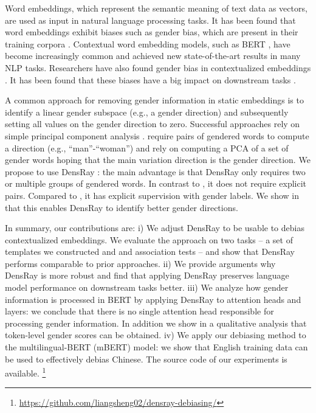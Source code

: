 Word embeddings, which represent the semantic meaning of
text data as vectors, are used as input in natural language
processing tasks. It has been found that word embeddings
exhibit biases such as gender bias, which are present in their training
corpora \cite{bolukbasi2016man,caliskan2017semantics,garg2018word}. Contextual word
embedding models, such as BERT \cite{devlin2018bert}, have
become increasingly common and achieved new state-of-the-art
results in many NLP tasks. Researchers have also found
gender bias in contextualized
embeddings \cite{zhao2019gender,may2019measuring}. It has been found that these biases have a big impact on downstream tasks \cite{vanmassenhove-etal-2018-getting,moryossef-etal-2019-filling,rudinger2018gender,zhao2018gender}.

A common approach for removing gender information in static
embeddings is to identify a linear gender subspace (e.g., a
gender direction) and subsequently setting all values on the
gender direction to zero. Successful approaches rely on simple
principal component
analysis \cite{bolukbasi2016man,mu2018all}. 
require pairs of gendered words to compute a direction
(e.g., ``man''-``woman'') and  rely on
computing a PCA of a set of gender words hoping that the
main variation direction is the gender direction. We propose to use
DensRay \cite{dufter2019analytical}: the main advantage is
that DensRay only requires two or multiple groups of
gendered words. In contrast to , it
does not require explicit pairs. Compared
to , it has explicit supervision with gender
labels. We show in  that this enables
DensRay to identify better gender directions.

In summary, our contributions are: 
i) We adjust DensRay to be usable to debias contextualized embeddings.
We evaluate the approach on two tasks -- a set of templates
we constructed and and association tests -- and show that DensRay performs comparable to prior approaches. 
ii) We provide arguments why DensRay is more robust and find that applying DensRay preserves language model performance on downstream tasks better.
iii) We analyze how gender information is processed in BERT by applying DensRay to attention heads and layers: we conclude that there is no single attention head responsible for processing gender information. In addition we show in a qualitative analysis that token-level gender scores can be obtained. 
iv) We apply our debiasing method to the multilingual-BERT (mBERT) model: we show that English training data can be used to effectively debias Chinese. The source code
of our experiments is available. \footnote{\url{https://github.com/liangsheng02/densray-debiasing/}}
